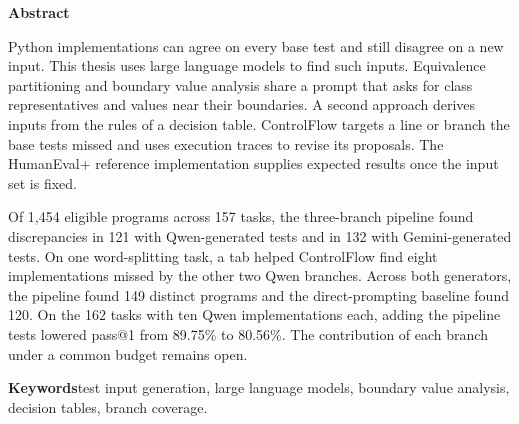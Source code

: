 \begin{center}
\textbf{\large Abstract}
\end{center}
\begin{small}

Python implementations can agree on every base test and still disagree on a new input. This thesis uses large language models to find such inputs. Equivalence partitioning and boundary value analysis share a prompt that asks for class representatives and values near their boundaries. A second approach derives inputs from the rules of a decision table. ControlFlow targets a line or branch the base tests missed and uses execution traces to revise its proposals. The HumanEval+ reference implementation supplies expected results once the input set is fixed.

Of 1,454 eligible programs across 157 tasks, the three-branch pipeline found discrepancies in 121 with Qwen-generated tests and in 132 with Gemini-generated tests. On one word-splitting task, a tab helped ControlFlow find eight implementations missed by the other two Qwen branches. Across both generators, the pipeline found 149 distinct programs and the direct-prompting baseline found 120. On the 162 tasks with ten Qwen implementations each, adding the pipeline tests lowered pass@1 from 89.75\% to 80.56\%. The contribution of each branch under a common budget remains open.

\vspace*{.6cm}
\textbf{Keywords}\quad test input generation, large language models, boundary value analysis, decision tables, branch coverage.

\end{small}
